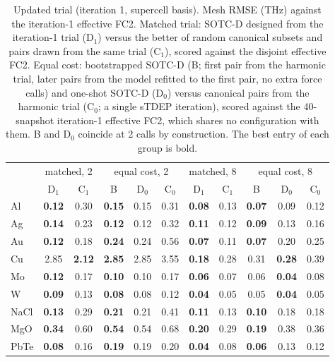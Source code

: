 \begin{table}[t]
\caption{Updated trial (iteration 1, supercell basis). Mesh RMSE (THz) against the iteration-1 effective FC2. Matched trial: SOTC-D designed from the iteration-1 trial (D$_1$) versus the better of random canonical subsets and pairs drawn from the same trial (C$_1$), scored against the disjoint effective FC2. Equal cost: bootstrapped SOTC-D (B; first pair from the harmonic trial, later pairs from the model refitted to the first pair, no extra force calls) and one-shot SOTC-D (D$_0$) versus canonical pairs from the harmonic trial (C$_0$; a single sTDEP iteration), scored against the 40-snapshot iteration-1 effective FC2, which shares no configuration with them. B and D$_0$ coincide at 2 calls by construction. The best entry of each group is bold.}
\label{tab:selfconsistent}
\begin{ruledtabular}
\begin{tabular}{lcccccccccc}
 & \multicolumn{2}{c}{matched, 2} & \multicolumn{3}{c}{equal cost, 2} & \multicolumn{2}{c}{matched, 8} & \multicolumn{3}{c}{equal cost, 8}\\
 & D$_1$ & C$_1$ & B & D$_0$ & C$_0$ & D$_1$ & C$_1$ & B & D$_0$ & C$_0$\\
\hline
Al & \textbf{0.12} & 0.30 & \textbf{0.15} & 0.15 & 0.31 & \textbf{0.08} & 0.13 & \textbf{0.07} & 0.09 & 0.12\\
Ag & \textbf{0.14} & 0.23 & \textbf{0.12} & 0.12 & 0.32 & \textbf{0.11} & 0.12 & \textbf{0.09} & 0.13 & 0.16\\
Au & \textbf{0.12} & 0.18 & \textbf{0.24} & 0.24 & 0.56 & \textbf{0.07} & 0.11 & \textbf{0.07} & 0.20 & 0.25\\
Cu & 2.85 & \textbf{2.12} & \textbf{2.85} & 2.85 & 3.55 & \textbf{0.18} & 0.28 & 0.31 & \textbf{0.28} & 0.39\\
Mo & \textbf{0.12} & 0.17 & \textbf{0.10} & 0.10 & 0.17 & \textbf{0.06} & 0.07 & 0.06 & \textbf{0.04} & 0.08\\
W & \textbf{0.09} & 0.13 & \textbf{0.08} & 0.08 & 0.12 & \textbf{0.04} & 0.05 & 0.05 & \textbf{0.04} & 0.05\\
NaCl & \textbf{0.13} & 0.29 & \textbf{0.21} & 0.21 & 0.41 & \textbf{0.11} & 0.13 & \textbf{0.10} & 0.18 & 0.18\\
MgO & \textbf{0.34} & 0.60 & \textbf{0.54} & 0.54 & 0.68 & \textbf{0.20} & 0.29 & \textbf{0.19} & 0.38 & 0.36\\
PbTe & \textbf{0.08} & 0.16 & \textbf{0.19} & 0.19 & 0.20 & \textbf{0.04} & 0.08 & \textbf{0.06} & 0.13 & 0.12\\

\end{tabular}
\end{ruledtabular}
\end{table}
